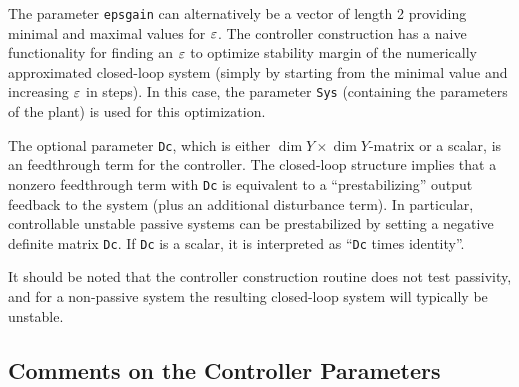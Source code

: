 \documentclass[11pt, a4paper]{amsart}
\newcommand{\COMMapproxRC}[1]{{\color{gray}#1}}
\renewcommand{\COMMapproxRC}[1]{}
\newcommand{\CL}{C_\Lambda}
\theoremstyle{definition}
\numberwithin{equation}{section}
\begin{document}
\begin{itemize}

The parameter \texttt{epsgain} can alternatively be a vector of length 2 providing minimal and maximal values for $\varepsilon$. The controller construction has a naive functionality for finding an $\varepsilon$ to optimize stability margin of the numerically approximated closed-loop system (simply by starting from the minimal value and increasing $\varepsilon$ in steps). In this case, the parameter \texttt{Sys} (containing the parameters of the plant) is used for this optimization.

The optional parameter \texttt{Dc}, which is either $\dim Y\times \dim Y$-matrix or a scalar, is an feedthrough term 
for the controller. The closed-loop structure implies that a nonzero feedthrough term with \texttt{Dc} is equivalent to a ``prestabilizing'' output feedback to the system (plus an additional disturbance term). In particular, controllable unstable passive systems can be prestabilized 
by setting a negative definite matrix \texttt{Dc}. If \texttt{Dc} is a scalar, it is
interpreted as ``\texttt{Dc} times identity''.

It should be noted that the controller construction routine does not test passivity, and for a non-passive system the resulting closed-loop system will typically be unstable.

	\bigskip

     \COMMapproxRC{
     \item An ``approximate robust controller'' based on the reference~\cite{HumKur19} for finite-dimensional approximate control design for systems with infinite-dimensional output spaces.\\[1ex]
	 Calling sequence for the construction:\\[-1ex]
	   \begin{quotation}
	     \texttt{ApproximateRC(\dots)}
	   \end{quotation}
	 }
\end{itemize}

\subsection{Comments on the Controller Parameters}
\end{document}
